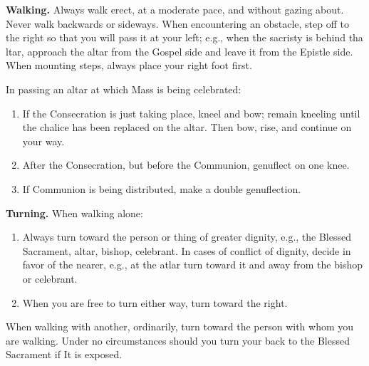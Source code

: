 \documentclass{report}
\begin{document}
\rubric \textbf{Walking.} Always walk erect, at a moderate pace, and without
gazing about. Never walk backwards or sideways. When encountering an obstacle,
step off to the right so that you will pass it at your left; e.g., when the
sacristy is behind tha ltar, approach the altar from the Gospel side and leave
it from the Epistle side. When mounting steps, always place your right foot
first.

In passing an altar at which Mass is being celebrated:

\begin{enumerate}

    \item If the Consecration is just taking place, kneel and bow; remain
        kneeling until the chalice has been replaced on the altar. Then bow,
        rise, and continue on your way.

    \item After the Consecration, but before the Communion, genuflect on one
        knee.

    \item If Communion is being distributed, make a double genuflection.

\end{enumerate}

\rubric \textbf{Turning.} When walking alone:

\begin{enumerate}

    \item Always turn toward the person or thing of greater dignity, e.g., the
        Blessed Sacrament, altar, bishop, celebrant. In cases of conflict of
        dignity, decide in favor of the nearer, e.g., at the atlar turn toward
        it and away from the bishop or celebrant.

    \item When you are free to turn either way, turn toward the right.

\end{enumerate}

When walking with another, ordinarily, turn toward the person with whom you are
walking. Under no circumstances should you turn your back to the Blessed
Sacrament if It is exposed.
\end{document}
